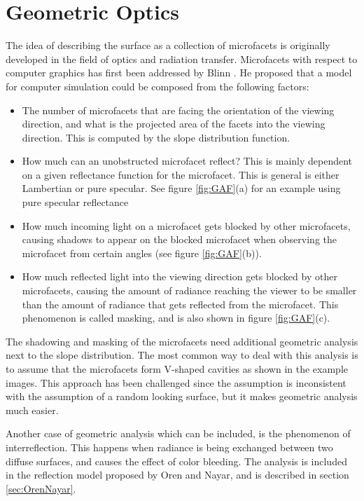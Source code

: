 \section{Geometric Optics}
The idea of describing the surface as a collection of microfacets is originally developed in the field of optics and radiation transfer. Microfacets with respect to computer graphics has first been addressed by Blinn \cite{Blinn}. He proposed that a model for computer simulation could be composed from the following factors:

\begin{itemize}
	\item{ The number of microfacets that are facing the orientation of the viewing direction, and what is the projected area of the facets into the viewing direction. This is computed by the slope distribution function. }
	\item{ How much can an unobstructed microfacet reflect? This is mainly dependent on a given reflectance function for the microfacet. This is general is either Lambertian or pure specular. See figure \ref{fig:GAF}(a) for an example using pure specular reflectance}
	\item{ How much incoming light on a microfacet gets blocked by other microfacets, causing shadows to appear on the blocked microfacet when observing the microfacet from certain angles (see figure \ref{fig:GAF}(b)).} 
	\item{ How much reflected light into the viewing direction gets blocked by other microfacets, causing the amount of radiance reaching the viewer to be smaller than the amount of radiance that gets reflected from the microfacet. This phenomenon is called masking, and is also shown in figure \ref{fig:GAF}(c). }
\end{itemize}

The shadowing and masking of the microfacets need additional geometric analysis next to the slope distribution. The most common way to deal with this analysis is to assume that the microfacets form V-shaped cavities as shown in the example images. This approach has been challenged since the assumption is inconsistent with the assumption of a random looking surface, but it makes geometric analysis much easier.

Another case of geometric analysis which can be included, is the phenomenon of interreflection. This happens when radiance is being exchanged between two diffuse surfaces, and causes the effect of color bleeding. The analysis is included in the reflection model proposed by Oren and Nayar, and is described in section \ref{sec:OrenNayar}.

